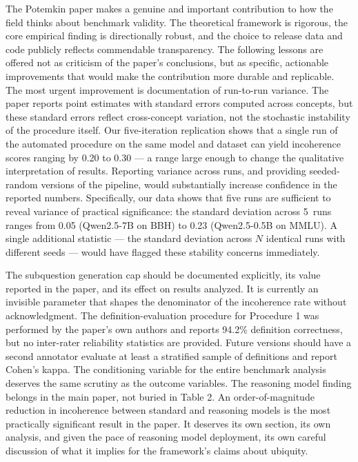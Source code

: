 \documentclass[sigconf,authordraft]{acmart}
\begin{document}
The Potemkin paper makes a genuine and important contribution to how the field thinks about benchmark validity. The theoretical framework is rigorous, the core empirical finding is directionally robust, and the choice to release data and code publicly reflects commendable transparency. The following lessons are offered not as criticism of the paper's conclusions, but as specific, actionable improvements that would make the contribution more durable and replicable.
The most urgent improvement is documentation of run-to-run variance. The paper reports point estimates with standard errors computed across concepts, but these standard errors reflect cross-concept variation, not the stochastic instability of the procedure itself. Our five-iteration replication shows that a single run of the automated procedure on the same model and dataset can yield incoherence scores ranging by 0.20 to 0.30 — a range large enough to change the qualitative interpretation of results. Reporting variance across runs, and providing seeded-random versions of the pipeline, would substantially increase confidence in the reported numbers.
Specifically, our data shows that five runs are sufficient to reveal variance of practical significance: the standard deviation across 5~runs ranges from 0.05 (Qwen2.5-7B on BBH) to 0.23 (Qwen2.5-0.5B on MMLU). A single additional statistic --- the standard deviation across $N$ identical runs with different seeds --- would have flagged these stability concerns immediately.

The subquestion generation cap should be documented explicitly, its value reported in the paper, and its effect on results analyzed. It is currently an invisible parameter that shapes the denominator of the incoherence rate without acknowledgment.
The definition-evaluation procedure for Procedure 1 was performed by the paper's own authors and reports 94.2\% definition correctness, but no inter-rater reliability statistics are provided. Future versions should have a second annotator evaluate at least a stratified sample of definitions and report Cohen's kappa. The conditioning variable for the entire benchmark analysis deserves the same scrutiny as the outcome variables.
The reasoning model finding belongs in the main paper, not buried in Table 2. An order-of-magnitude reduction in incoherence between standard and reasoning models is the most practically significant result in the paper. It deserves its own section, its own analysis, and given the pace of reasoning model deployment, its own careful discussion of what it implies for the framework's claims about ubiquity.
\end{document}
